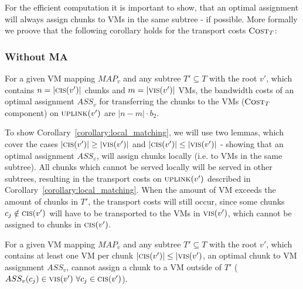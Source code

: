 \documentclass[9pt,twocolumn]{scrartcl}
\newcommand{\Chunk}{\ensuremath{c}}
\newcommand{\VmChunkAssignment}{\ensuremath{ASS_v}}
\newcommand{\NodeMapping}{\ensuremath{MAP_v}}
\newcommand{\SubstrateNode}{\ensuremath{v}}
\newcommand{\Cost}{\textsc{Cost}}
\newcommand{\Tree}{\ensuremath{T}}
\newcommand{\CostTrans}{\ensuremath{b_2}}
\begin{document}
For the efficient computation it is
important to show, that an optimal assignment will always assign chunks to VMs
in the same subtree - if possible. More formally we proove that the following
corollary holds for the transport costs $\Cost_T$:

\subsubsection{Without MA}

\begin{corollary}
\label{corollary:local_matching}
For a given VM mapping $\NodeMapping$ and any subtree $\Tree' \subseteq
\Tree$ with the root $\SubstrateNode'$, which contains $n =
|\ChunkCount(\SubstrateNode')|$ chunks and $m = |\VmCount(\SubstrateNode')|$
VMs, the bandwidth costs of an optimal assignment $\VmChunkAssignment$ for
transferring the chunks to the VMs ($\Cost_T$
component) on $\Uplink(\SubstrateNode')$ are $|n
- m| \cdot \CostTrans$.
\end{corollary}

To show Corollary~\ref{corollary:local_matching}, we will use two lemmas, which
cover the cases $|\ChunkCount(\SubstrateNode')| \geq
|\VmCount(\SubstrateNode')|$ and $|\ChunkCount(\SubstrateNode')| \leq
|\VmCount(\SubstrateNode')|$ - showing that an optimal assignment
$\VmChunkAssignment$, will assign chunks locally (i.e. to VMs in the
same subtree). All chunks which cannot be served locally will be served in
other subtrees, resulting in the transport costs on $\Uplink(\SubstrateNode')$
described in Corollary~\ref{corollary:local_matching}. When the amount of VM
exceeds the amount of chunks in $\Tree'$, the transport costs will still occur,
since some chunks $\Chunk_j \notin \ChunkCount(\SubstrateNode')$ will have to
be transported to the VMs in $\VmCount(\SubstrateNode')$, which cannot be
assigned to chunks in $\ChunkCount(\SubstrateNode')$.

\begin{lemma}
\label{lemma:matching1}
For a given VM mapping $\NodeMapping$ and any subtree $\Tree' \subseteq
\Tree$ with the root $\SubstrateNode'$, which contains at least one VM per
chunk $|\ChunkCount(\SubstrateNode')| \leq |\VmCount(\SubstrateNode')$, an
optimal chunk to VM assignment $\VmChunkAssignment$, cannot assign a chunk
to a VM outside of $\Tree'$ ($\VmChunkAssignment(\Chunk_j) \in
\VmCount(\SubstrateNode')~ \forall \Chunk_j \in \ChunkCount(\SubstrateNode')$).
\end{lemma}
\end{document}
